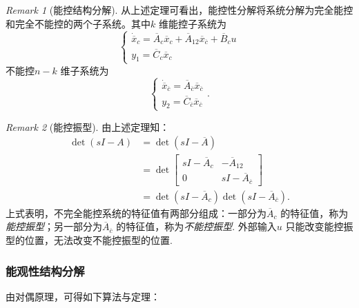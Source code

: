 \documentclass[14pt,a4paper]{article}
\theoremstyle{plain}
\theoremstyle{definition}
\theoremstyle{remark}
\newtheorem{rmk}{Remark}[section]
\theoremstyle{plain}
\theoremstyle{plain}
\theoremstyle{plain}
\theoremstyle{definition}
\theoremstyle{remark}
\numberwithin{equation}{section}
\begin{document}
				\begin{rmk}[能控结构分解]  
				\label{rmk:能控结构分解}
					从上述定理可看出，能控性分解将系统分解为完全能控和完全不能控的两个子系统。其中$k$ 维能控子系统为
					\[
					\begin{cases}
						\dot{\overline{x}}_c = \overline{A}_c \overline{x}_c + \overline{A}_{12} \overline{x}_{\overline{c}} + \overline{B}_c u \\ 
						y_1 = \overline{C}_c \overline{x}_c
					\end{cases} 
					\]
					不能控$n-k$ 维子系统为
					\[
					\begin{cases}
						\dot{\overline{x}}_{\overline{c}} = \overline{A}_{\overline{c}} \overline{x}_{\overline{c}} \\ 
						y_2 = \overline{C}_{\overline{c}} \overline{x}_{\overline{c}}
					\end{cases} 
					.\] 
				\end{rmk} 
				\begin{rmk}[能控振型]  
				\label{rmk:能控振型}
					由上述定理知：
					\[ 
						\begin{split}
							\mathop{\text{det}} (sI-A)
							&= \mathop{\text{det}} (sI-\overline{A} )\\
							&= \mathop{\text{det}} \begin{bmatrix}
								sI - \overline{A}_c & -\overline{A}_{12}\\
								0 & sI-\overline{A}_{\overline{c}} 
							\end{bmatrix} \\
							&= \mathop{\text{det}} (sI - \overline{A}_c) \mathop{\text{det}} (sI-\overline{A}_{\overline{c}}). 
						\end{split}
					\]
					上式表明，不完全能控系统的特征值有两部分组成：一部分为$\overline{A}_c$ 的特征值，称为\emph{能控振型}；另一部分为$\overline{A}_{\overline{c}}$ 的特征值，称为\emph{不能控振型}. 外部输入$u$ 只能改变能控振型的位置，无法改变不能控振型的位置. 
				\end{rmk} 

			\subsubsection{能观性结构分解}%
			\label{ssub:能观性结构分解}
			
				由对偶原理，可得如下算法与定理：
\end{document}
